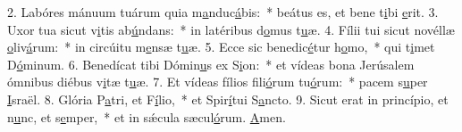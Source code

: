 2. Labóres mánuum tuárum quia m\uline{a}nduc\uline{á}bis:~* beátus es, et bene t\uline{i}bi \uline{e}rit.
3. Uxor tua sicut v\uline{i}tis ab\uline{ú}ndans:~* in latéribus d\uline{o}mus t\uline{u}æ.
4. Fílii tui sicut novéllæ \uline{o}liv\uline{á}rum:~* in circúitu m\uline{e}nsæ t\uline{u}æ.
5. Ecce sic benedic\uline{é}tur h\uline{o}mo,~* qui t\uline{i}met D\uline{ó}minum.
6. Benedícat tibi Dómin\uline{u}s ex S\uline{i}on:~* et vídeas bona Jerúsalem ómnibus diébus v\uline{i}tæ t\uline{u}æ.
7. Et vídeas fílios fili\uline{ó}rum tu\uline{ó}rum:~* pacem s\uline{u}per \uline{I}sraël.
8. Glória P\uline{a}tri, et F\uline{í}lio,~* et Spir\uline{í}tui S\uline{a}ncto.
9. Sicut erat in princípio, et n\uline{u}nc, et s\uline{e}mper,~* et in sǽcula sæcul\uline{ó}rum. \uline{A}men.
